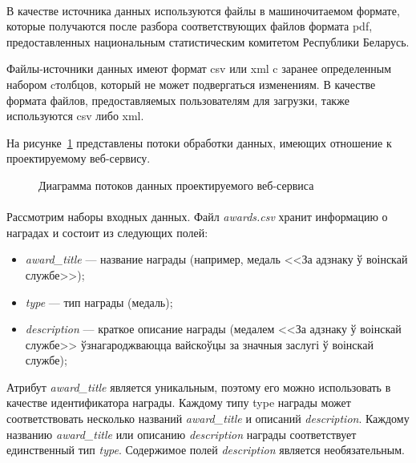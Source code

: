 \paragraph{}
В качестве источника данных используются файлы в машиночитаемом формате,
которые получаются после разбора соответствующих файлов формата pdf,
предоставленных национальным статистическим комитетом Республики Беларусь.

Файлы-источники данных имеют формат csv или xml c заранее определенным
набором cтолбцов, который не может подвергаться изменениям.
В качестве формата файлов, предоставляемых пользователям для загрузки,
также используются csv либо xml.

На рисунке~\ref{fig:activity_diagram} представлены потоки обработки данных,
имеющих отношение к проектируемому веб-сервису.

\begin{figure}[h!]
  \centering
  \small{
    
  }
  \caption{Диаграмма потоков данных проектируемого веб-сервиса}
  \label{fig:activity_diagram}
\end{figure}

\paragraph{}
Рассмотрим наборы входных данных.
Файл \textit{awards.csv} хранит информацию о наградах и состоит из следующих полей:
\begin{itemize}
\item
  \textit{award\_title} --- название награды
  (например, медаль <<За адзнаку ў воінскай службе>>);
\item
  \textit{type} --- тип награды
  (медаль);
\item
  \textit{description} --- краткое описание награды
  (медалем <<За адзнаку ў воінскай службе>>
  ўзнагароджваюцца вайскоўцы за значныя заслугі ў воінскай службе);
\end{itemize}

Атрибут \textit{award\_title} является уникальным, поэтому его можно использовать
в качестве идентификатора награды.
Каждому типу type награды может соответствовать несколько названий 
\textit{award\_title} и описаний \textit{description}.
Каждому названию \textit{award\_title} или описанию \textit{description} награды
соответствует единственный тип \textit{type}.
Содержимое полей \textit{description} является необязательным.

